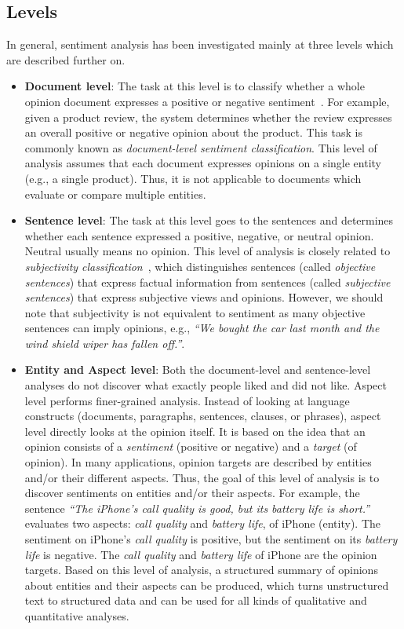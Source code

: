 \subsection{Levels}
\label{subsec:levels}

In general,
sentiment analysis has been investigated mainly at three levels
which are described further on.

\begin{itemize}
 \item \textbf{Document level}: The task at this level is
 to classify whether a whole opinion document expresses a positive or negative sentiment~\cite{PLV02}.
 For example, given a product review, the system determines
 whether the review expresses an overall positive or negative opinion
 about the product.
 This task is commonly known as \emph{document-level sentiment classification}. This level of analysis assumes that each document expresses opinions
 on a single entity (e.g., a single product).
 Thus, it is not applicable to documents which evaluate
 or compare multiple entities.
 
 \item \textbf{Sentence level}: The task at this level goes to the sentences
 and determines whether each sentence expressed a positive, negative,
 or neutral opinion.
 Neutral usually means no opinion.
 This level of analysis is closely related
 to \emph{subjectivity classification}~\cite{WBO99},
 which distinguishes sentences (called \emph{objective sentences})
 that express factual information
 from sentences (called \emph{subjective sentences})
 that express subjective views and opinions.
 However, we should note that subjectivity is not equivalent to sentiment
 as many objective sentences can imply opinions,
 e.g., \emph{``We bought the car last month
 and the wind shield wiper has fallen off.''}.
 
 \item \textbf{Entity and Aspect level}: Both the document-level
 and sentence-level analyses do not discover
 what exactly people liked and did not like.
 Aspect level performs finer-grained analysis.
 Instead of looking at language constructs
 (documents, paragraphs, sentences, clauses, or phrases),
 aspect level directly looks at the opinion itself.
 It is based on the idea that an opinion consists
 of a \emph{sentiment} (positive or negative) and a \emph{target} (of opinion).
 In many applications,
 opinion targets are described by entities and/or their different aspects.
 Thus, the goal of this level of analysis is
 to discover sentiments on entities and/or their aspects.
 For example, the sentence
 \emph{``The iPhone's call quality is good, but its battery life is short.''} evaluates two aspects:
 \emph{call quality} and \emph{battery life}, of iPhone (entity).
 The sentiment on iPhone's \emph{call quality} is positive,
 but the sentiment on its \emph{battery life} is negative.
 The \emph{call quality} and \emph{battery life}
 of iPhone are the opinion targets.
 Based on this level of analysis,
 a structured summary of opinions about entities and their aspects
 can be produced, which turns unstructured text to structured data
 and can be used for all kinds of qualitative and quantitative analyses.
\end{itemize}

